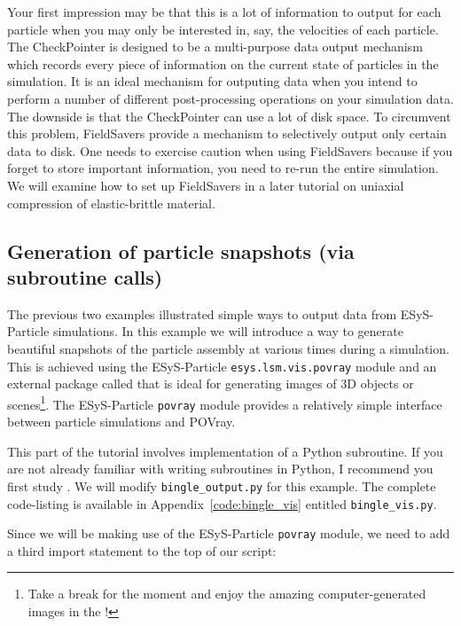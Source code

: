 Your first impression may be that this is a lot of information to output for each particle when you may only be interested in, say, the velocities of each particle. The CheckPointer is designed to be a multi-purpose data output mechanism which records every piece of information on the current state of particles in the simulation. It is an ideal mechanism for outputing data when you intend to perform a number of different post-processing operations on your simulation data. The downside is that the CheckPointer can use a lot of disk space. To circumvent this problem, FieldSavers provide a mechanism to selectively output only certain data to disk. One needs to exercise caution when using FieldSavers because if you forget to store important information, you need to re-run the entire simulation. We will examine how to set up FieldSavers in a later tutorial on uniaxial compression of elastic-brittle material.

\subsection{Generation of particle snapshots (via subroutine calls)}

The previous two examples illustrated simple ways to output data from ESyS-Particle simulations. In this example we will introduce a way to generate beautiful snapshots of the particle assembly at various times during a simulation. This is achieved using the ESyS-Particle \texttt{esys.lsm.vis.povray} module and an external package called  that is ideal for generating images of 3D objects or scenes\footnote{Take a break for the moment and enjoy the amazing computer-generated images in the !}. The ESyS-Particle \texttt{povray} module provides a relatively simple interface between particle simulations and POVray. 

This part of the tutorial involves implementation of a Python subroutine. If you are not already familiar with writing subroutines in Python, I recommend you first study .  We will modify \texttt{bingle\_output.py} for this example.  The complete code-listing is available in Appendix~\ref{code:bingle_vis} entitled \texttt{bingle\_vis.py}.

Since we will be making use of the ESyS-Particle \texttt{povray} module, we need to add a third import statement to the top of our script: 

